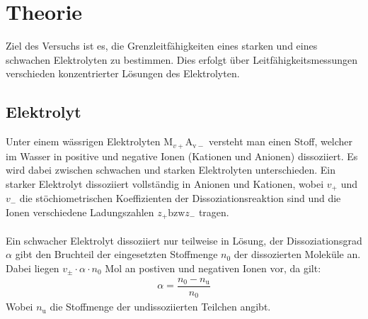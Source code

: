 \documentclass[12pt,a4paper,titlepage,headinclude,bibtotoc]{scrartcl}
\begin{document}
\begin{titlepage}

\end{titlepage}

\tableofcontents

\newpage

\section{Theorie}
Ziel des Versuchs ist es, die Grenzleitfähigkeiten eines starken und eines schwachen Elektrolyten zu bestimmen. Dies erfolgt über Leitfähigkeitsmessungen verschieden konzentrierter Lösungen des Elektrolyten.
\subsection{Elektrolyt}
Unter einem wässrigen Elektrolyten $\mathrm{M}_{v+}\mathrm{A_{v-}}$ versteht man einen Stoff, welcher im Wasser in positive und negative Ionen (Kationen und Anionen) dissoziiert. Es wird dabei zwischen schwachen und starken Elektrolyten unterschieden. Ein starker Elektrolyt dissoziiert vollständig in Anionen und Kationen, wobei $v_+$ und $v_-$ die stöchiometrischen Koeffizienten der Dissoziationsreaktion sind und die Ionen verschiedene Ladungszahlen $z_+\mathrm{bzw} z_-$ tragen.\\\\
Ein schwacher Elektrolyt dissoziiert nur teilweise in Lösung, der Dissoziationsgrad $\alpha $ gibt den Bruchteil der eingesetzten Stoffmenge $n_0$ der dissozierten Moleküle an. Dabei liegen $v_{\pm } \cdot \alpha \cdot n_0$ Mol an postiven und negativen Ionen vor, da gilt:
\begin{align}
\alpha = \dfrac{n_0 - n_\mathrm{u}}{n_0}
\end{align} 
Wobei $n_\mathrm{u}$ die Stoffmenge der undissoziierten Teilchen angibt.
\end{document}
